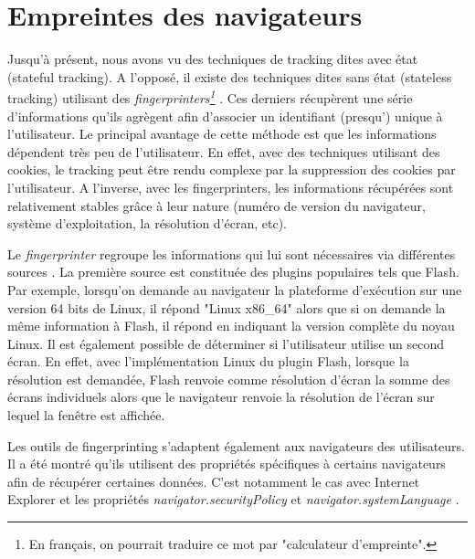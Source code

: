 \section{Empreintes des navigateurs}
\label{fingerprinters}
Jusqu'à présent, nous avons vu des techniques de tracking dites avec état (stateful tracking). A l'opposé, il existe des techniques dites sans état (stateless tracking) utilisant des \textit{fingerprinters\footnote{En français, on pourrait traduire ce mot par "calculateur d'empreinte".}} \cite{Mayer:2012:TWT:2310656.2310703}. Ces derniers récupèrent une série d'informations qu'ils agrègent afin d'associer un identifiant (presqu') unique à l'utilisateur. Le principal avantage de cette méthode est que les informations dépendent très peu de l'utilisateur.
En effet, avec des techniques utilisant des cookies, le tracking peut être rendu complexe par la suppression des cookies par l'utilisateur. A l'inverse, avec les fingerprinters, les informations récupérées sont relativement stables grâce à leur nature (numéro de version du navigateur, système d'exploitation, la résolution d'écran, etc).
\newline

Le \textit{fingerprinter} regroupe les informations qui lui sont nécessaires via différentes sources \cite{Nikiforakis:2013:CME:2497621.2498133}. La première source est constituée des plugins populaires tels que Flash. Par exemple, lorsqu'on demande au navigateur la plateforme d'exécution sur une version 64 bits de Linux, il répond "Linux x86\_64" alors que si on demande la même information à Flash, il répond en indiquant la version complète du noyau Linux. Il est également possible de déterminer si l'utilisateur utilise un second écran. En effet, avec l'implémentation Linux du plugin Flash, lorsque la résolution est demandée, Flash renvoie comme résolution d'écran la somme des écrans individuels alors que le navigateur renvoie la résolution de l'écran sur lequel la fenêtre est affichée.

Les outils de fingerprinting s'adaptent également aux navigateurs des utilisateurs. Il a été montré qu'ils utilisent des propriétés spécifiques à certains navigateurs afin de récupérer certaines données. C'est notamment le cas avec Internet Explorer et les propriétés \textit{navigator.securityPolicy} et \textit{navigator.systemLanguage} \cite{Nikiforakis:2013:CME:2497621.2498133}.

